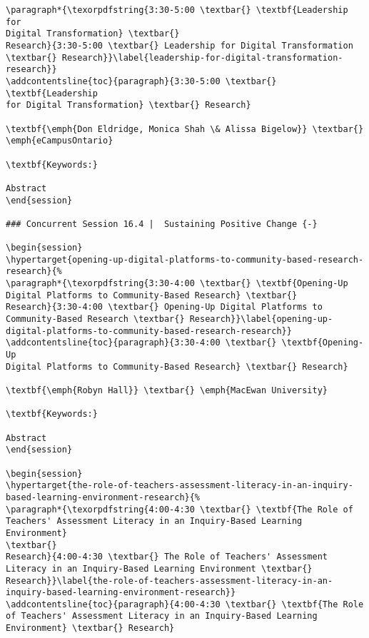 \documentclass[
]{book}
\begin{document}
\begin{verbatim}
\paragraph*{\texorpdfstring{3:30-5:00 \textbar{} \textbf{Leadership for
Digital Transformation} \textbar{}
Research}{3:30-5:00 \textbar{} Leadership for Digital Transformation \textbar{} Research}}\label{leadership-for-digital-transformation-research}}
\addcontentsline{toc}{paragraph}{3:30-5:00 \textbar{} \textbf{Leadership
for Digital Transformation} \textbar{} Research}

\textbf{\emph{Don Eldridge, Monica Shah \& Alissa Bigelow}} \textbar{}
\emph{eCampusOntario}

\textbf{Keywords:}

Abstract
\end{session}

### Concurrent Session 16.4 |  Sustaining Positive Change {-}

\begin{session}
\hypertarget{opening-up-digital-platforms-to-community-based-research-research}{%
\paragraph*{\texorpdfstring{3:30-4:00 \textbar{} \textbf{Opening-Up
Digital Platforms to Community-Based Research} \textbar{}
Research}{3:30-4:00 \textbar{} Opening-Up Digital Platforms to Community-Based Research \textbar{} Research}}\label{opening-up-digital-platforms-to-community-based-research-research}}
\addcontentsline{toc}{paragraph}{3:30-4:00 \textbar{} \textbf{Opening-Up
Digital Platforms to Community-Based Research} \textbar{} Research}

\textbf{\emph{Robyn Hall}} \textbar{} \emph{MacEwan University}

\textbf{Keywords:}

Abstract
\end{session}

\begin{session}
\hypertarget{the-role-of-teachers-assessment-literacy-in-an-inquiry-based-learning-environment-research}{%
\paragraph*{\texorpdfstring{4:00-4:30 \textbar{} \textbf{The Role of
Teachers' Assessment Literacy in an Inquiry-Based Learning Environment}
\textbar{}
Research}{4:00-4:30 \textbar{} The Role of Teachers' Assessment Literacy in an Inquiry-Based Learning Environment \textbar{} Research}}\label{the-role-of-teachers-assessment-literacy-in-an-inquiry-based-learning-environment-research}}
\addcontentsline{toc}{paragraph}{4:00-4:30 \textbar{} \textbf{The Role
of Teachers' Assessment Literacy in an Inquiry-Based Learning
Environment} \textbar{} Research}


\end{verbatim}
\end{document}
